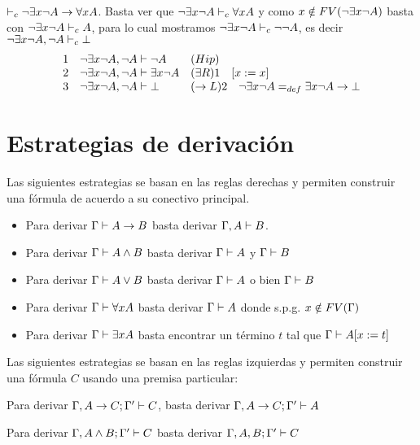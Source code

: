 \documentclass[11pt,letterpaper]{article}
\begin{document}
\item $\vdash_c \neg\ex x\neg A\imp \fa x A$. 
Basta ver que $\neg\ex x\neg A\vdash_c\fa xA$ y como 
$x\notin FV(\neg\ex x\neg A)$ basta con $\neg\ex x\neg A\vdash_c A$, para lo 
cual mostramos $\neg\ex x\neg A\vdash_c \neg\neg A$, es decir 
$\neg\ex x\neg A,\neg A\vdash_c \bot$
\[
\ba{rll}
1 & \neg\ex x\neg A,\neg A\vdash \neg A & (Hip)\\
2 & \neg\ex x\neg A,\neg A\vdash \ex x\neg A & (\ex R) 1 \quad [x:=x]\\
3 & \neg\ex x\neg A,\neg A\vdash \bot & (\imp L) 2 \quad \neg\ex x\neg A 
=_{def} \ex x\neg A \to \bot \\
\ea
\]


\ei


\section{Estrategias de derivación}
Las siguientes estrategias se basan en las reglas derechas y permiten 
construir una fórmula de acuerdo a su conectivo principal. 

\begin{itemize}
\item Para derivar $\G\vdash A\to B$ basta derivar $\G,A\vdash B$.
\vspace*{5pt}
\item Para derivar  $\G\vdash A\land B$ basta derivar $\G\vdash A$ y 
$\G\vdash B$
\vspace*{5pt}
\item Para derivar $\G\vdash A\lor B$ basta derivar $\G\vdash A$ o bien 
$\G\vdash B$
\vspace*{5pt}
\item Para derivar $\G\vdash \forall x A$ basta derivar $\G\vdash A$ donde 
s.p.g. $x\notin FV(\G)$
\vspace*{5pt}
\item Para derivar $\G\vdash \exists x A$ basta encontrar un término $t$ tal 
que $\G\vdash A[x:=t]$
\end{itemize}


Las siguientes estrategias se basan en las reglas izquierdas y permiten 
construir una fórmula $C$ usando una premisa particular:
\bi
\item Para derivar $\G,A\to C;\G'\vdash C$, basta derivar 
$ \G,A\to C;\G'\vdash A $

\item Para derivar $\G,A\land B;\G'\vdash C$ basta derivar 
$ \G,A,B;\G'\vdash C $
\end{document}
